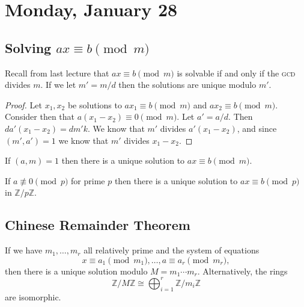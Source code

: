 
\section{Monday, January 28}

\subsection{Solving \texorpdfstring{$ax \equiv b \pmod{m}$}{ax = b (m)}}

Recall from last lecture that $ax \equiv b \pmod{m}$ is solvable if and only if the \textsc{gcd} divides $m$. If we let $m' = m/d$ then the solutions are unique modulo $m'$.

\begin{proof}
Let $x_1,x_2$ be solutions to $ax_1 \equiv b \pmod{m}$ and $ax_2 \equiv b \pmod{m}$. Consider then that $a(x_1-x_2) \equiv 0 \pmod{m}$. Let $a' = a/d$. Then $da'(x_1-x_2) = dm'k$. We know that $m'$ divides $a'(x_1-x_2)$, and since $(m',a') = 1$ we know that $m'$ divides $x_1-x_2$.
\end{proof}

\begin{corollary}
If $(a,m) = 1$ then there is a  unique solution to $ax \equiv b \pmod{m}$.
\end{corollary}

\begin{corollary}
If $a \not\equiv 0 \pmod{p}$ for prime $p$ then there is a unique solution to $ax \equiv b \pmod{p}$ in $\mathbb{Z}/p\mathbb{Z}$.
\end{corollary}

\subsection*{Chinese Remainder Theorem}

\begin{theorem}
If we have $m_1, \dotsc, m_r$ all relatively prime and the system of equations 
\[
	x \equiv a_1 \pmod{m_1}, \dotsc, a \equiv a_r \pmod{m_r},
\]
then there is a unique solution modulo $M = m_1 \cdots m_r$. Alternatively, the rings
\[ \mathbb{Z}/M\mathbb{Z} \cong \bigoplus_{i=1}^r \mathbb{Z}/m_i\mathbb{Z} \]
are isomorphic.
\end{theorem}

